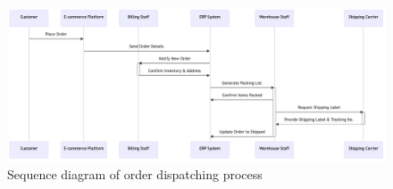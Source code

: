 \begin{figure}[H]\centering
\includegraphics[width=140mm]{img/chap02/fig_proces_sequence_diagram_highres.png}
\caption{Sequence diagram of order dispatching process}
\label{img02:order-dispatch-process}
\end{figure}


